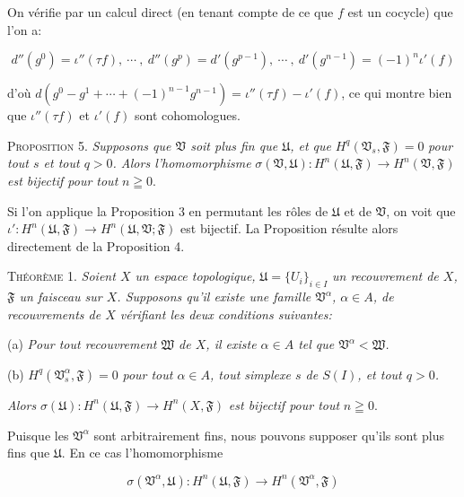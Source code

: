 On vérifie par un calcul direct (en tenant compte de ce que $f$ est un cocycle) que l'on a:

\begin{equation*}
d''(g^0) = \iota''(\tau f), \ \cdots \ , \ d''(g^p) = d'(g^{p-1}), \ \cdots \ , \ d'(g^{n-1}) = (-1)^n \iota'(f)
\end{equation*}

d'où $d(g^0 - g^1 + \cdots + (-1)^{n-1} g^{n-1}) = \iota''(\tau f) - \iota'(f)$, ce qui montre bien que $\iota''(\tau f)$ et $\iota'(f)$ sont cohomologues.

\textsc{Proposition} 5. \textit{Supposons que $\mathfrak{V}$ soit plus fin que $\mathfrak{U}$, et que} $H^q(\mathfrak{V}_s , \mathfrak{F}) = 0$ \textit{pour tout $s$ et tout $q > 0$. Alors l'homomorphisme} $\sigma(\mathfrak{V}, \mathfrak{U}): H^n(\mathfrak{U}, \mathfrak{F}) \rightarrow H^n(\mathfrak{V}, \mathfrak{F})$ \textit{est bijectif pour tout} $n \geqq 0$.

Si l'on applique la Proposition 3 en permutant les rôles de $\mathfrak{U}$ et de $\mathfrak{V}$, on voit que $\iota': H^n(\mathfrak{U}, \mathfrak{F}) \rightarrow H^n(\mathfrak{U}, \mathfrak{V}; \mathfrak{F})$ est bijectif. La Proposition résulte alors directement de la Proposition 4.

\textsc{Théorème} 1. \textit{Soient $X$ un espace topologique,} $\mathfrak{U} = \{U_i\}_{i \in I}$ \textit{un recouvrement de $X$, $\mathfrak{F}$ un faisceau sur $X$. Supposons qu'il existe une famille $\mathfrak{V}^\alpha$, $\alpha \in A$, de recouvrements de $X$ vérifiant les deux conditions suivantes:}

(a) \textit{Pour tout recouvrement $\mathfrak{W}$ de $X$, il existe $\alpha \in A$ tel que $\mathfrak{V}^\alpha < \mathfrak{W}$.}

(b) $H^q(\mathfrak{V}^\alpha_s , \mathfrak{F}) = 0$ \textit{pour tout $\alpha \in A$, tout simplexe $s$ de $S(I)$, et tout $q > 0$.}

\textit{Alors} $\sigma(\mathfrak{U}): H^n(\mathfrak{U}, \mathfrak{F}) \rightarrow H^n(X, \mathfrak{F})$ \textit{est bijectif pour tout} $n \geqq 0$.

Puisque les $\mathfrak{V}^\alpha$ sont arbitrairement fins, nous pouvons supposer qu'ils sont plus fins que $\mathfrak{U}$. En ce cas l'homomorphisme

\begin{equation*}
\sigma(\mathfrak{V}^\alpha, \mathfrak{U}) : H^n(\mathfrak{U}, \mathfrak{F}) \longrightarrow H^n(\mathfrak{V}^\alpha, \mathfrak{F})
\end{equation*}

